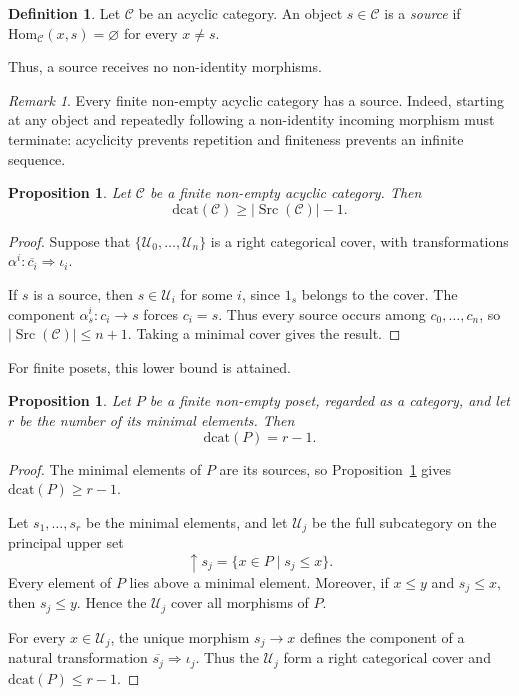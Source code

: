 \documentclass[12pt]{amsart}
\newtheorem{prop}[teo]{Proposition}
\theoremstyle{definition}
\newtheorem{definition}[teo]{Definition}
\theoremstyle{remark}
\newtheorem{remark}{Remark}
\numberwithin{figure}{section}%
\newcommand{\CC}{\mathcal{C}}
\newcommand{\Uc}{\mathcal{U}}
\newcommand{\Hom}{\mathrm{Hom}}
\begin{document}
\begin{definition}
Let \(\CC\) be an acyclic category. An object \(s\in\CC\) is a
\emph{source} if \(\Hom_\CC(x,s)=\varnothing\) for every \(x\neq s\).
\end{definition}

Thus, a source receives no non-identity morphisms.

\begin{remark}
Every finite non-empty acyclic category has a source. Indeed, starting at
any object and repeatedly following a non-identity incoming morphism must
terminate: acyclicity prevents repetition and finiteness prevents an
infinite sequence.
\end{remark}

\begin{prop}\label{prop:dcat_sources_lower_bound}
Let \(\CC\) be a finite non-empty acyclic category. Then
\[
\mathrm{dcat}(\CC)
\geq
|\operatorname{Src}(\CC)|-1.
\]
\end{prop}

\begin{proof}
Suppose that \(\{\Uc_0,\ldots,\Uc_n\}\) is a right categorical cover, with
transformations
\(\alpha^i\colon\overline{c_i}\Rightarrow\iota_i\).

If \(s\) is a source, then \(s\in\Uc_i\) for some \(i\), since \(1_s\)
belongs to the cover. The component \(\alpha^i_s\colon c_i\to s\) forces
\(c_i=s\). Thus every source occurs among \(c_0,\ldots,c_n\), so
\(|\operatorname{Src}(\CC)|\leq n+1\). Taking a minimal cover gives the
result.
\end{proof}

For finite posets, this lower bound is attained.

\begin{prop}\label{prop:dcat_finite_poset}
Let \(P\) be a finite non-empty poset, regarded as a category, and let
\(r\) be the number of its minimal elements. Then
\[
\mathrm{dcat}(P)=r-1.
\]
\end{prop}

\begin{proof}
The minimal elements of \(P\) are its sources, so
Proposition~\ref{prop:dcat_sources_lower_bound} gives
\(\mathrm{dcat}(P)\geq r-1\).

Let \(s_1,\ldots,s_r\) be the minimal elements, and let \(\Uc_j\) be the
full subcategory on the principal upper set
\[
\uparrow s_j=\{x\in P\mid s_j\leq x\}.
\]
Every element of \(P\) lies above a minimal element. Moreover, if
\(x\leq y\) and \(s_j\leq x\), then \(s_j\leq y\). Hence the
\(\Uc_j\) cover all morphisms of \(P\).

For every \(x\in\Uc_j\), the unique morphism \(s_j\to x\) defines the
component of a natural transformation
\(\overline{s_j}\Rightarrow\iota_j\). Thus the \(\Uc_j\) form a right
categorical cover and \(\mathrm{dcat}(P)\leq r-1\).
\end{proof}
\end{document}
